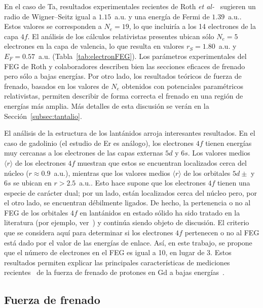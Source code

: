 En el caso de Ta, resultados experimentales recientes de Roth
\textit{et al-}~\cite{Roth:17} 
sugieren un radio de Wigner--Seitz igual a $1.15$~a.u. y una energía de 
Fermi de $1.39$~a.u.. Estos valores se corresponden a $N_e=19$, 
lo que incluiría a los 14 electrones de la capa $4f$. El análisis de 
los cálculos relativistas presentes ubican sólo $N_e=5$ electrones en la 
capa de valencia, lo que resulta en valores $r_S=1.80$~a.u. y 
$E_F=0.57$~a.u. (Tabla~\ref{tab:electronFEG}). Los parámetros 
experimentales del FEG de Roth y colaboradores describen bien las 
secciones eficaces de frenado pero sólo a bajas energías. Por otro lado, 
los resultados teóricos de fuerza de frenado, basados en los valores de 
$N_e$ obtenidos con potenciales paramétricos relativistas, permiten 
describir de forma correcta el frenado en una región de energías más 
amplia. Más detalles de esta discusión se verán en la 
Sección~\ref{subsec:tantalio}.

El análisis de la estructura de los lantánidos arroja interesantes 
resultados. En el caso de gadolinio (el estudio de Er es análogo), 
los electrones $4f$ tienen energías muy cercanas a los electrones de las 
capas externas $5d$ y $6s$. Los valores medios $\langle r\rangle$ de los 
electrones $4f$ muestran que estos se encuentran localizados cerca del 
núcleo (\mbox{$r\approx 0.9$~a.u.}), mientras que los valores medios 
$\langle r\rangle$ de los orbitales $5d\pm$ y $6s$ se ubican en 
\mbox{$r>2.5$~a.u.}. Esto hace supone que los electrones $4f$ tienen una 
especie de carácter dual; por un lado, están localizados cerca del 
núcleo pero, por el otro lado, se encuentran débilmente ligados. De 
hecho, la pertenencia o no al FEG de los orbitales $4f$ en lantánidos en 
estado sólido ha sido tratado en la 
literatura (por ejemplo, ver~\cite{Strange:99,Bonnelle:15}) y continúa 
siendo objeto de discusión. El criterio que se considera aquí para 
determinar si los electrones $4f$ pertenecen o no al FEG está dado por 
el valor de las energías de enlace. Así, en este trabajo, se propone que 
el número de electrones en el FEG es igual a 10, en lugar de 3. Estos 
resultados permiten explicar las principales características de 
mediciones recientes~\cite{Montanari:17} de la fuerza de frenado de 
protones en Gd a bajas energías~\cite{Roth:17}. 

\subsection{Fuerza de frenado}
\label{subsec:results-stopping}

